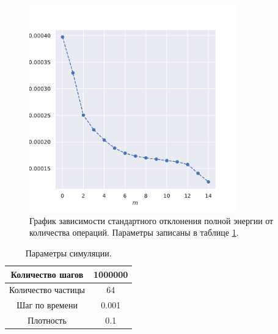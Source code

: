 \documentclass[a4paper,12pt]{article}
\begin{document}
\begin{figure}[H]
    \centering
    \includegraphics[width=0.8\textwidth]{../../media/blocks.pdf}
    \caption{График зависимости стандартного отклонения полной энергии от количества операций. Параметры записаны в таблице \ref{tab4}.}
\end{figure}

\begin{table}[H]
    \centering
    \caption{Параметры симуляции.}
    \label{tab4}
    \begin{tabular}{| c | c |}
        \hline
        Количество шагов & 1000000 \\
        \hline
        Количество частицы & 64 \\
        \hline
        Шаг по времени & 0.001 \\
        \hline
        Плотность & 0.1 \\
        \hline
    \end{tabular}
\end{table}
\end{document}
